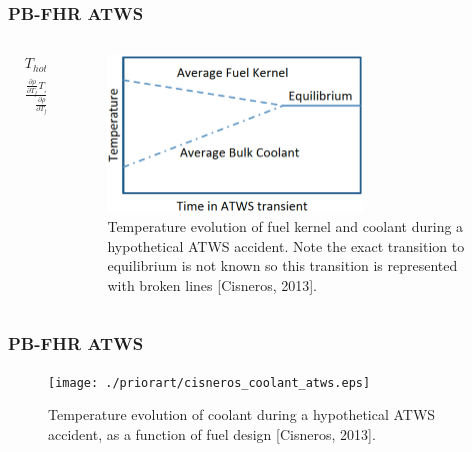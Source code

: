 \begin{frame}[fragile]
  \frametitle{PB-FHR ATWS}

  \begin{columns}[t]
      \begin{column}{0.3\linewidth}
        \footnotesize{
        \begin{align}
        &T_{hot-shutdown} \approx \nonumber\\
        &\frac{
          \frac{\partial \rho}{\partial T_{f}}T_{f}+ 
                        \frac{\partial \rho}{\partial T_{c}}T_{c}}
                        {\frac{\partial \rho}{\partial T_{f}}+ 
                         \frac{\partial \rho}{\partial T_{c}}}\nonumber
        \end{align}
      }
      \end{column}
      \begin{column}{0.7\linewidth}
      \begin{figure}[h]
      \begin{center}
            \includegraphics[width=0.7\textwidth]{./priorart/cisneros_atws.eps}
      \end{center}
        \caption{Temperature evolution of fuel kernel and coolant during a 
        hypothetical ATWS accident. Note the exact transition to equilibrium is 
        not known so this transition is represented with broken lines 
        [Cisneros, 2013].}
      \label{fig:cisneros_atws}
      \end{figure}
      \end{column}
    \end{columns}
\end{frame}

\begin{frame}[fragile]
  \frametitle{PB-FHR ATWS}

      \begin{figure}[h]
      \begin{center}
            \texttt{[image: ./priorart/cisneros\_coolant\_atws.eps]}
      \end{center}
        \caption{Temperature evolution of coolant during a 
        hypothetical ATWS accident, as a function of fuel design [Cisneros, 2013].}
      \label{fig:cisneros_atws}
      \end{figure}

\end{frame}

